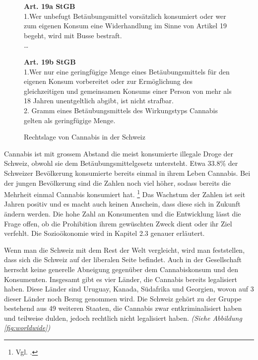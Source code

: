 \documentclass[../main.tex]{subfiles}
\begin{document}
	 \begin{figure}[H]
	 \begin{tcolorbox}
	 	\textbf{Art. 19a StGB}\\[7pt]
		1.\quad Wer unbefugt Betäubungsmittel vorsätzlich konsumiert oder wer zum eigenen Konsum eine Widerhandlung im Sinne von Artikel 19 begeht, wird mit Busse bestraft.\\[10pt]
		\ldots
	\end{tcolorbox}
	
	\begin{tcolorbox}
		\textbf{Art. 19b StGB}\\[7pt]
	 	1.\quad Wer nur eine geringfügige Menge eines Betäubungsmittels für den eigenen Konsum vorbereitet oder zur Ermöglichung des gleichzeitigen und gemeinsamen Konsums einer Person von mehr als 18 Jahren unentgeltlich abgibt, ist nicht strafbar.\\[10pt]
2. Gramm eines Betäubungsmittels des Wirkungstyps Cannabis gelten als geringfügige Menge.
	 \end{tcolorbox}
	 \captionsetup{font=small}
	 \caption{Rechtslage von Cannabis in der Schweiz}
	 \label{fig:stgb-art-19}
	 \end{figure}
	 
	 
	 \noindent
	 Cannabis ist mit grossem Abstand die meist konsumierte illegale Droge der Schweiz, obwohl sie dem Betäubungsmittelgesetz untersteht. 
	 Etwa 33.8\% der Schweizer Bevölkerung konsumierte bereits einmal in ihrem Leben Cannabis. 
	 Bei der jungen Bevölkerung sind die Zahlen noch viel höher, sodass bereits die Mehrheit einmal Cannabis konsumiert hat.%
	 \footnote{Vgl. \cite[85]{gmel}.}
	 Das Wachstum der Zahlen ist seit Jahren positiv und es macht auch keinen Anschein, dass diese sich in Zukunft ändern werden.
	 Die hohe Zahl an Konsumenten und die Entwicklung lässt die Frage offen, ob die Prohibition ihrem gewüschten Zweck dient oder ihr Ziel verfehlt.
	 Die Sozioökonomie wird in Kapitel 2.3 genauer erläutert.
	 
	 \noindent
	 Wenn man die Schweiz mit dem Rest der Welt vergleicht, wird man feststellen, dass sich die Schweiz auf der liberalen Seite befindet.
	 Auch in der Gesellschaft herrscht keine generelle Abneigung gegenüber dem Cannabiskonsum und den Konsumenten.	
	 Insgesamt gibt es vier Länder, die Cannabis bereits legalisiert haben.
	 Diese Länder sind Uruguay, Kanada, Südafrika und Georgien, wovon auf 3 dieser Länder noch Bezug genommen wird.
	 Die Schweiz gehört zu der Gruppe bestehend aus 49 weiteren Staaten, die Cannabis zwar entkriminalisiert haben und teilweise dulden, jedoch rechtlich nicht legalisiert haben. \textit{(Siehe Abbildung \ref{fig:worldwide})}\\
	 
\end{document}
